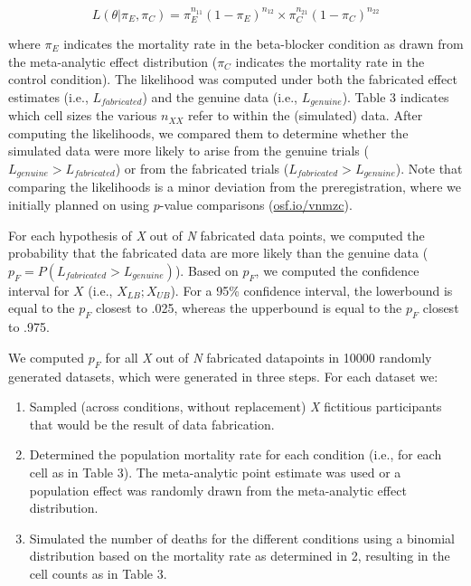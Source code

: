 \documentclass[]{article}
\begin{document}
\begin{equation}
\label{eq1}
L(\theta|\pi_{E},\pi_{C})=\pi_{E}^{n_{11}}(1-\pi_{E})^{n_{12}} \times \pi_{C}^{n_{21}}(1 - \pi_{C})^{n_{22}}
\end{equation}

where \(\pi_{E}\) indicates the mortality rate in the beta-blocker
condition as drawn from the meta-analytic effect distribution
(\(\pi_{C}\) indicates the mortality rate in the control condition). The
likelihood was computed under both the fabricated effect estimates
(i.e., \(L_{fabricated}\)) and the genuine data (i.e., \(L_{genuine}\)).
Table 3 indicates which cell sizes the various \(n_{XX}\) refer to
within the (simulated) data. After computing the likelihoods, we
compared them to determine whether the simulated data were more likely
to arise from the genuine trials (\(L_{genuine}>L_{fabricated}\)) or
from the fabricated trials (\(L_{fabricated}>L_{genuine}\)). Note that
comparing the likelihoods is a minor deviation from the preregistration,
where we initially planned on using \(p\)-value comparisons
(\href{https://osf.io/vnmzc}{osf.io/vnmzc}).

For each hypothesis of \emph{X} out of \emph{N} fabricated data points,
we computed the probability that the fabricated data are more likely
than the genuine data (\(p_F=P(L_{fabricated}>L_{genuine})\)). Based on
\(p_F\), we computed the confidence interval for \(X\) (i.e.,
\(X_{LB};X_{UB}\)). For a 95\% confidence interval, the lowerbound is
equal to the \(p_F\) closest to .025, whereas the upperbound is equal to
the \(p_F\) closest to .975.

We computed \(p_F\) for all \emph{X} out of \emph{N} fabricated
datapoints in 10000 randomly generated datasets, which were generated in
three steps. For each dataset we:

\begin{enumerate}
\def\labelenumi{\arabic{enumi}.}
\item
  Sampled (across conditions, without replacement) \emph{X} fictitious
  participants that would be the result of data fabrication.
\item
  Determined the population mortality rate for each condition (i.e., for
  each cell as in Table 3). The meta-analytic point estimate was used or
  a population effect was randomly drawn from the meta-analytic effect
  distribution.
\item
  Simulated the number of deaths for the different conditions using a
  binomial distribution based on the mortality rate as determined in 2,
  resulting in the cell counts as in Table 3.
\end{enumerate}
\end{document}
